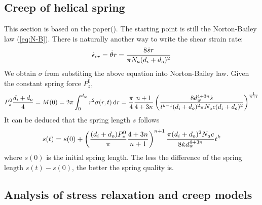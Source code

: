 \documentclass[10pt]{article}
\begin{document}
\subsection{Creep of helical spring}
This section is based on the paper(\cite{Relaxation3}). The starting point is still the Norton-Bailey law (\ref{eq:N-B}). There is naturally another way to write the shear strain rate:
\[
\dot{\epsilon}_{cr} = \dot{\theta} r = {8\dot{s} r\over \pi N_a (d_i+d_o)^2}
\]
We obtain $\sigma$ from substiting the above equation into Norton-Bailey law. Given the constant spring force $P_z^0$,
\[
P_z^0{d_i+d_o\over 4}=M(0)=2\pi\int_0^{d_w} r^2 \sigma(r,t)\,\mathrm{d} r
={\pi\over 4}{n+1\over 4+3n}\left( {8d_w^{4+3n}\dot{s} \over t^{k-1} (d_i+d_o)^2 \pi N_a c (d_i+d_o)^2} \right)^{{1\over n+1}}
\]
It can be deduced that the spring length $s$ follows
\[
s(t) = s(0) + \left( {(d_i+d_o)P_z^0\over \pi}{4+3n\over n+1} \right)^{n+1} {\pi (d_i+d_o)^2 N_a c\over 8kd_w^{4+3n}} t^k
\]
where $s(0)$ is the initial spring length. The less the difference of the spring length $s(t)-s(0)$, the better the spring quality is.
 
 \cite{Ch2000} \cite{Relaxation1} \cite{Relaxation2} \cite{Relaxation3} \cite{Creep} 
\subsection{Analysis of stress relaxation and creep models}
\label{sec:stressanalysis}




\vfill\pagebreak


	
	


\end{document}
